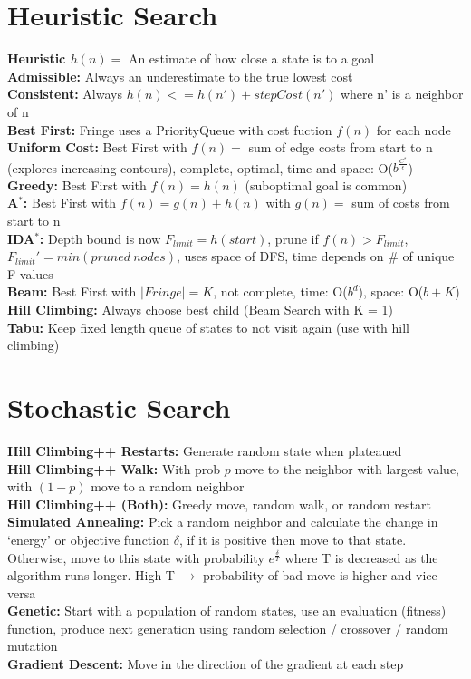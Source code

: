 \documentclass[11pt, a4paper]{article}
\begin{document}
\begin{multicols*}{1}
        \section*{Heuristic Search}
            \textbf{Heuristic $h(n)=$} An estimate of how close a state is to a goal\\
            \textbf{Admissible:} Always an underestimate to the true lowest cost\\
            \textbf{Consistent:} Always $h(n) <= h(n') + stepCost(n')$ where n' is a neighbor of n\\
            \textbf{Best First:} Fringe uses a PriorityQueue with cost fuction $f(n)$ for each node\\
            \textbf{Uniform Cost:} Best First with $f(n)=$ sum of edge costs from  start to n (explores increasing contours), complete, optimal, time and space: O($b^{\frac{C^*}{\epsilon}}$)\\
            \textbf{Greedy:} Best First with $f(n)= h(n)$ (suboptimal goal is common)\\
            \textbf{A$^*$:} Best First with $f(n)= g(n) + h(n)$ with $g(n)=$ sum of costs from start to n\\
            \textbf{IDA$^*$:} Depth bound is now $F_{limit} = h(start)$, prune if $f(n) > F_{limit}$,\\ $F_{limit}' = min(pruned\ nodes)$, uses space of DFS, time depends on \# of unique F values\\
            \textbf{Beam:} Best First with $|Fringe| = K$, not complete, time: O($b^d$), space: O($b + K$)\\
            \textbf{Hill Climbing:} Always choose best child (Beam Search with K = 1)\\
            \textbf{Tabu:} Keep fixed length queue of states to not visit again (use with hill climbing)\\
        \section*{Stochastic Search}
            \textbf{Hill Climbing++ Restarts:} Generate random state when plateaued\\
            \textbf{Hill Climbing++ Walk:} With prob $p$ move to the neighbor with largest value, with $(1 - p)$ move to a random neighbor\\
            \textbf{Hill Climbing++ (Both):} Greedy move, random walk, or random restart\\
            \textbf{Simulated Annealing:} Pick a random neighbor and calculate the change in `energy' or objective function $\delta$, if it is positive then move to that state. Otherwise, move to this state with probability $e^\frac{\delta}{T}$ where T is decreased as the algorithm runs longer. High T $\to$ probability of bad move is higher and vice versa\\
            \textbf{Genetic:} Start with a population of random states, use an evaluation (fitness) function, produce next generation using random selection / crossover / random mutation\\
            \textbf{Gradient Descent:} Move in the direction of the gradient at each step

\end{multicols*}
\end{document}

